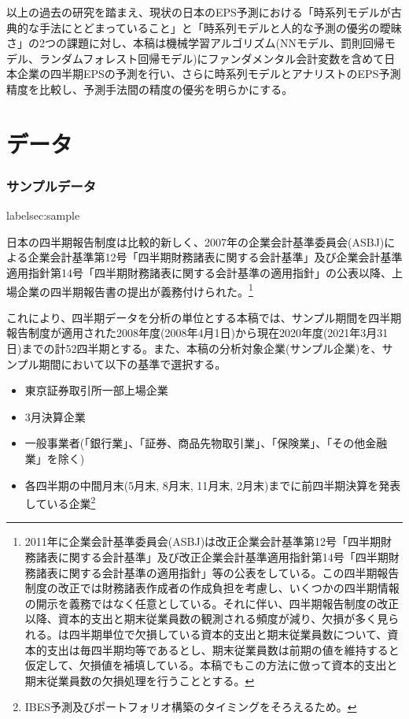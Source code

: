 \documentclass[a4paper, 12pt]{jsarticle}
\begin{document}

以上の過去の研究を踏まえ、現状の日本のEPS予測における「時系列モデルが古典的な手法にとどまっていること」と「時系列モデルと人的な予測の優劣の曖昧さ」の2つの課題に対し、本稿は機械学習アルゴリズム(NNモデル、罰則回帰モデル、ランダムフォレスト回帰モデル)にファンダメンタル会計変数を含めて日本企業の四半期EPSの予測を行い、さらに時系列モデルとアナリストのEPS予測精度を比較し、予測手法間の精度の優劣を明らかにする。

\part{データ}

\section{サンプルデータ} label{sec:sample}

日本の四半期報告制度は比較的新しく、2007年の企業会計基準委員会(ASBJ)による企業会計基準第12号「四半期財務諸表に関する会計基準」及び企業会計基準適用指針第14号「四半期財務諸表に関する会計基準の適用指針」の公表以降、上場企業の四半期報告書の提出が義務付けられた。\footnote{2011年に企業会計基準委員会(ASBJ)は改正企業会計基準第12号「四半期財務諸表に関する会計基準」及び改正企業会計基準適用指針第14号「四半期財務諸表に関する会計基準の適用指針」等の公表をしている。この四半期報告制度の改正では財務諸表作成者の作成負担を考慮し、いくつかの四半期情報の開示を義務ではなく任意としている。それに伴い、四半期報告制度の改正以降、資本的支出と期末従業員数の観測される頻度が減り、欠損が多く見られる。\cite{zhang2004neural}は四半期単位で欠損している資本的支出と期末従業員数について、資本的支出は毎四半期均等であるとし、期末従業員数は前期の値を維持すると仮定して、欠損値を補填している。本稿でもこの方法に倣って資本的支出と期末従業員数の欠損処理を行うこととする。}

これにより、四半期データを分析の単位とする本稿では、サンプル期間を四半期報告制度が適用された2008年度(2008年4月1日)から現在2020年度(2021年3月31日)までの計52四半期とする。また、本稿の分析対象企業(サンプル企業)を、サンプル期間において以下の基準で選択する。

\begin{itemize}
  \item 東京証券取引所一部上場企業
  \item 3月決算企業
  \item 一般事業者(「銀行業」、「証券、商品先物取引業」、「保険業」、「その他金融業」を除く)
  \item 各四半期の中間月末(5月末, 8月末, 11月末, 2月末)までに前四半期決算を発表している企業\footnote{IBES予測及びポートフォリオ構築のタイミングをそろえるため。}
\end{itemize}
\end{document}
